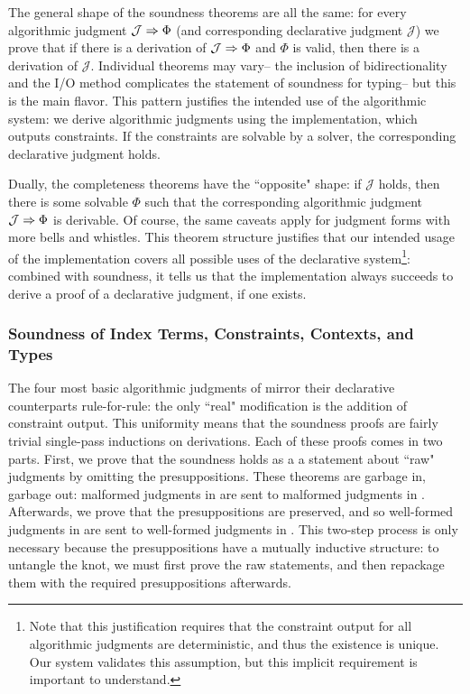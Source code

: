 The general shape of the soundness theorems are all the same: for every algorithmic judgment $\mathcal{J} \Rightarrow \Phi$ (and corresponding declarative judgment $\mathcal{J}$) we prove that if there is a derivation of $\mathcal{J} \Rightarrow \Phi$ and $\Phi$ is valid, then there is a derivation of $\mathcal{J}$. Individual theorems may vary-- the inclusion of bidirectionality and the I/O method complicates the statement of soundness for typing-- but this is the main flavor. This pattern justifies the intended use of the algorithmic system: we derive algorithmic judgments using the implementation, which outputs constraints. If the constraints are solvable by a solver, the corresponding declarative judgment holds.

Dually, the completeness theorems have the ``opposite" shape: if $\mathcal{J}$ holds, then there is some solvable $\Phi$ such that the corresponding algorithmic judgment $\mathcal{J} \Rightarrow \Phi$ is derivable. Of course, the same caveats apply for judgment forms with more bells and whistles. This theorem structure justifies that our intended usage of the implementation covers all possible uses of the declarative system\footnote{Note that this justification requires that the constraint output for all algorithmic judgments are deterministic, and thus the existence is unique. Our system validates this assumption, but this implicit requirement is important to understand.}: combined with soundness, it tells us that the implementation always succeeds to derive a proof of a declarative judgment, if one exists.

\subsubsection{Soundness of Index Terms, Constraints, Contexts, and Types}
The four most basic algorithmic judgments of \bilambdaamor mirror their declarative counterparts rule-for-rule: the only ``real" modification is the addition of constraint output. This uniformity means that the soundness proofs are fairly trivial single-pass inductions on derivations. Each of these proofs comes in two parts. First, we prove that the soundness holds as a a statement about ``raw" judgments by omitting the presuppositions. These theorems are garbage in, garbage out: malformed judgments in \bilambdaamor are sent to malformed judgments in \dlambdaamor. Afterwards, we prove that the presuppositions are preserved, and so well-formed judgments in \bilambdaamor are sent to well-formed judgments in \dlambdaamor. This two-step process is only necessary because the presuppositions have a mutually inductive structure: to untangle the knot, we must first prove the raw statements, and then repackage them with the required presuppositions afterwards.


